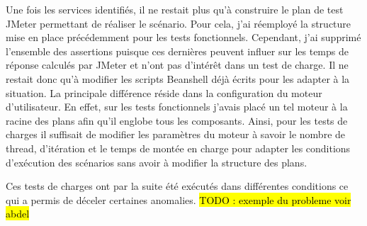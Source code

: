 	Une fois les services identifiés, il ne restait plus qu'à construire le plan de test JMeter permettant de réaliser le scénario. Pour cela, j'ai réemployé la structure mise en place précédemment pour les tests fonctionnels. Cependant, j'ai supprimé l'ensemble des assertions puisque ces dernières peuvent influer sur les temps de réponse calculés par JMeter et n'ont pas d'intérêt dans un test de charge. Il ne restait donc qu'à modifier les scripts Beanshell déjà écrits pour les adapter à la situation. La principale différence réside dans la configuration du moteur d'utilisateur. En effet, sur les tests fonctionnels j'avais placé un tel moteur à la racine des plans afin qu'il englobe tous les composants. Ainsi, pour les tests de charges il suffisait de modifier les paramètres du moteur à savoir le nombre de thread, d'itération et le temps de montée en charge pour adapter les conditions d'exécution des scénarios sans avoir à modifier la structure des plans.
	
	Ces tests de charges ont par la suite été exécutés dans différentes conditions ce qui a permis de déceler certaines anomalies. \hl{TODO : exemple du probleme voir abdel}
